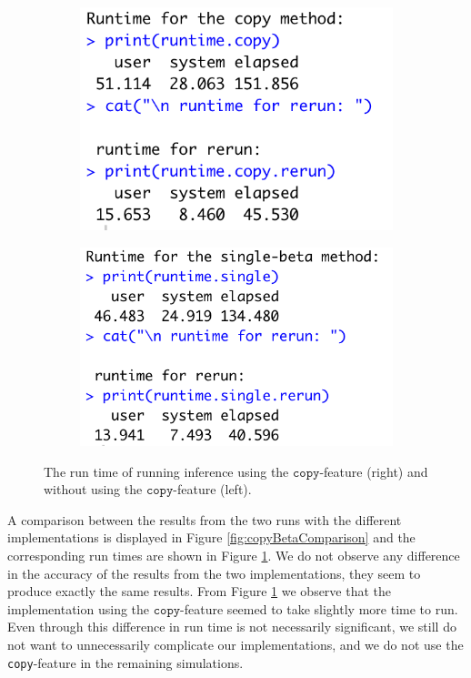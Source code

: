 \begin{figure}[h!]
    \centering
    \begin{subfigure}[b]{0.45\textwidth}
        \centering
        \includegraphics[trim=0 5 0 0,clip,width=\textwidth]{synthetic-data/Figures/runtime-copy.png}
    \end{subfigure}
    \begin{subfigure}[b]{0.45\textwidth}
        \centering
        \includegraphics[trim=0 0 15 0,clip, width=\textwidth]{synthetic-data/Figures/runtime-single.png}
    \end{subfigure}
    \caption{The run time of running \inlabru inference using the $\texttt{copy}$-feature (right) and without using the $\texttt{copy}$-feature (left).}
    \label{fig:copyBetaRuntimes}
\end{figure}

\newpar A comparison between the results from the two runs with the different implementations is displayed in Figure \ref{fig:copyBetaComparison} and the corresponding run times are shown in Figure \ref{fig:copyBetaRuntimes}. We do not observe any difference in the accuracy of the results from the two implementations, they seem to produce exactly the same results. From Figure \ref{fig:copyBetaRuntimes} we observe that the implementation using the $\texttt{copy}$-feature seemed to take slightly more time to run. Even through this difference in run time is not necessarily significant, we still do not want to unnecessarily complicate our implementations, and we do not use the \texttt{copy}-feature in the remaining simulations.

